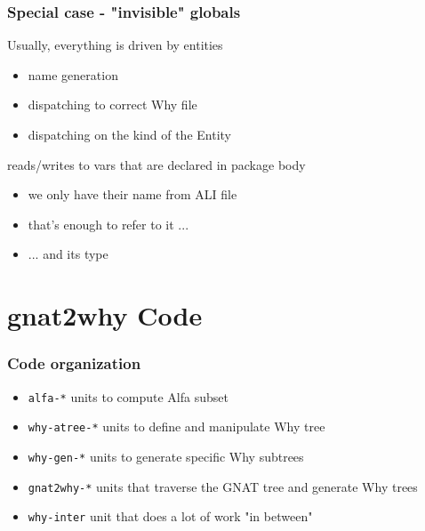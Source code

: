 \documentclass{beamer}
\newenvironment{specialframe}{%
  \begin{frame}[fragile,environment=specialframe]}{\end{frame}}
\begin{document}
\begin{specialframe}\frametitle{Special case - "invisible" globals}
   \begin{block}{Usually, everything is driven by entities}
      \begin{itemize}
         \item name generation
         \item dispatching to correct Why file
         \item dispatching on the kind of the Entity
      \end{itemize}
   \end{block}
   \begin{block}{reads/writes to vars that are declared in package body}
      \begin{itemize}
         \item we only have their name from ALI file
         \item that's enough to refer to it ...
         \item ... and its type
      \end{itemize}
   \end{block}
\end{specialframe}

\section{gnat2why Code}
\begin{specialframe}\frametitle{Code organization}
   \begin{itemize}
      \item \verb|alfa-*|       units to compute Alfa subset
      \item \verb|why-atree-*|  units to define and manipulate Why tree
      \item \verb|why-gen-*|    units to generate specific Why subtrees
      \item \verb|gnat2why-*|   units that traverse the GNAT tree and generate
         Why trees
      \item \verb|why-inter|    unit that does a lot of work "in between"
   \end{itemize}
\end{specialframe}
\end{document}
